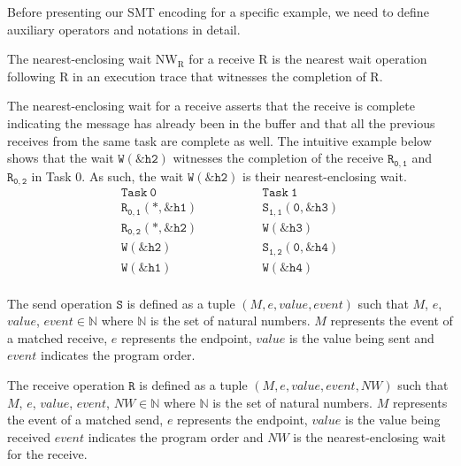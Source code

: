 Before presenting our SMT encoding for a specific example, we need to define auxiliary operators and notations in detail.

\begin{definition}
The nearest-enclosing wait $\mathrm{NW_R}$ for a receive $\mathrm{R}$ is the nearest wait operation following $\mathrm{R}$ in an execution trace that witnesses the completion of $\mathrm{R}$.
\end{definition}

The nearest-enclosing wait for a receive asserts that the receive is complete indicating the message has already been in the buffer and that all the previous receives from the same task are complete as well. The intuitive example below shows that the wait $\mathtt{W{(\&h2)}}$ witnesses the completion of the receive $\mathtt{R_{0,1}}$ and $\mathtt{R_{0,2}}$ in Task 0. As such, the wait $\mathtt{W{(\&h2)}}$ is their nearest-enclosing wait.
\[
\begin{array}{l|l}
\;\;\;\;\;\;\;\;\mathtt{Task\ 0}\;\;\;\;\;\;\;\; & \;\;\;\;\;\;\;\; \mathtt{Task\ 1}\;\;\;\;\;\;\;\; \\
\hline
\;\;\;\;\;\;\;\;\mathtt{R_{0,1}(*,\&h1)}\;\;\;\;\;\;\;\; & \;\;\;\;\;\;\;\; \mathtt{S_{1,1}(0,\&h3)}\;\;\;\;\;\;\;\; \\
\;\;\;\;\;\;\;\;\mathtt{R_{0,2}(*,\&h2)}\;\;\;\;\;\;\;\; & \;\;\;\;\;\;\;\; \mathtt{W{(\&h3)}}\;\;\;\;\;\;\;\; \\
\;\;\;\;\;\;\;\;\mathtt{W{(\&h2)}}\;\;\;\;\;\;\;\; & \;\;\;\;\;\;\;\; \mathtt{S_{1,2}(0,\&h4)}\;\;\;\;\;\;\;\; \\
\;\;\;\;\;\;\;\;\mathtt{W{(\&h1)}}\;\;\;\;\;\;\;\; & \;\;\;\;\;\;\;\; \mathtt{W{(\&h4)}}\;\;\;\;\;\;\;\; \\
\end{array}
\]

\begin{definition}
The send operation $\mathtt{S}$ is defined as a tuple $(M,e,value,event)$ such that $\mathit{M}$, $\mathit{e}$, $\mathit{value}$, $\mathit{event}$$ \in \mathbb{N}$ where $\mathbb{N}$ is the set of natural numbers. $M$ represents the event of a matched receive, $e$ represents the endpoint, $value$ is the value being sent and $event$ indicates the program order.
\label{def:snd}
\end{definition}

\begin{definition}
The receive operation $\mathtt{R}$ is defined as a tuple $(M,e,value,event,NW)$ such that $\mathit{M}$, $\mathit{e}$, $\mathit{value}$, $\mathit{event}$, $\mathit{NW}$$ \in \mathbb{N}$ where $\mathbb{N}$ is the set of natural numbers. $M$ represents the event of a matched send, $e$ represents the endpoint, $value$ is the value being received $event$ indicates the program order and $\mathit{NW}$ is the nearest-enclosing wait for the receive.
\label{def:rcv}
\end{definition}

